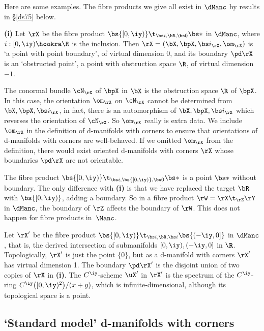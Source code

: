 \documentclass{article}
\begin{document}
Here are some examples. The fibre products we give all exist in
$\dManc$ by results in \S\ref{ds75} below.

\begin{ex}{\bf(i)} Let $\rX$ be the fibre product
$\bs{[0,\iy)}\t_{\bs i,\bR,\bs 0}\bs *$ in $\dManc$, where
$i:[0,\iy)\hookra\R$ is the inclusion. Then $\rX=(\bX,\bpX,\bs
i_\rX,\om_\rX)$ is `a point with point boundary', of virtual
dimension 0, and its boundary $\pd\rX$ is an `obstructed point', a
point with obstruction space $\R$, of virtual dimension~$-1$.

The conormal bundle $\cN_\rX$ of $\bpX$ in $\bX$ is the obstruction
space $\R$ of $\bpX$. In this case, the orientation $\om_\rX$ on
$\cN_\rX$ cannot be determined from $\bX,\bpX,\bs i_\rX$, in fact,
there is an automorphism of $\bX,\bpX,\bs i_\rX$ which reverses the
orientation of $\cN_\rX$. So $\om_\rX$ really is extra data. We
include $\om_\rX$ in the definition of d-manifolds with corners to
ensure that orientations of d-manifolds with corners are
well-behaved. If we omitted $\om_\rX$ from the definition, there
would exist oriented d-manifolds with corners $\rX$ whose boundaries
$\pd\rX$ are not orientable.
\smallskip

 The fibre product $\bs{[0,\iy)}\t_{\bs
i,\bs{[0,\iy)},\bs 0}\bs *$ is a point $\bs *$ without boundary. The
only difference with {\bf(i)} is that we have replaced the target
$\bR$ with $\bs{[0,\iy)}$, adding a boundary. So in a fibre product
$\rW=\rX\t_\rZ\rY$ in $\dManc$, the boundary of $\rZ$ affects the
boundary of $\rW$. This does not happen for fibre products
in~$\Manc$.

\smallskip

 Let $\rX'$ be the fibre product
$\bs{[0,\iy)}\t_{\bs i,\bR,\bs i}\bs{(-\iy,0]}$ in $\dManc$, that
is, the derived intersection of submanifolds $[0,\iy),(-\iy,0]$ in
$\R$. Topologically, $\rX'$ is just the point $\{0\}$, but as a
d-manifold with corners $\rX'$ has virtual dimension 1. The boundary
$\pd\rX'$ is the disjoint union of two copies of $\rX$ in {\bf(i)}.
The $C^\iy$-scheme $\uX'$ in $\rX'$ is the
spectrum of the
$C^\iy$-ring $C^\iy\bigl([0,\iy)^2\bigr)/(x+y)$, which is
infinite-dimensional, although its topological space is a
point.
\label{ds7ex1}
\end{ex}

\subsection{`Standard model' d-manifolds with corners}
\label{ds72}
\end{document}
